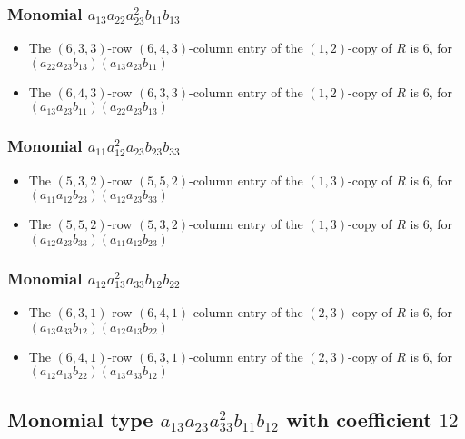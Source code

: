 \documentclass{article}
\begin{document}
\subsubsection{Monomial $ a_{13} a_{22} a_{23}^{2} b_{11} b_{13} $}

\begin{itemize}
\item The $(6, 3, 3)$-row $(6, 4, 3)$-column entry of the $ \left(1, 2\right) $-copy of $R$ is $ 6 $, for $( a_{22} a_{23} b_{13} )( a_{13} a_{23} b_{11} )$ 
\item The $(6, 4, 3)$-row $(6, 3, 3)$-column entry of the $ \left(1, 2\right) $-copy of $R$ is $ 6 $, for $( a_{13} a_{23} b_{11} )( a_{22} a_{23} b_{13} )$ 
\end{itemize}
\subsubsection{Monomial $ a_{11} a_{12}^{2} a_{23} b_{23} b_{33} $}

\begin{itemize}
\item The $(5, 3, 2)$-row $(5, 5, 2)$-column entry of the $ \left(1, 3\right) $-copy of $R$ is $ 6 $, for $( a_{11} a_{12} b_{23} )( a_{12} a_{23} b_{33} )$ 
\item The $(5, 5, 2)$-row $(5, 3, 2)$-column entry of the $ \left(1, 3\right) $-copy of $R$ is $ 6 $, for $( a_{12} a_{23} b_{33} )( a_{11} a_{12} b_{23} )$ 
\end{itemize}
\subsubsection{Monomial $ a_{12} a_{13}^{2} a_{33} b_{12} b_{22} $}

\begin{itemize}
\item The $(6, 3, 1)$-row $(6, 4, 1)$-column entry of the $ \left(2, 3\right) $-copy of $R$ is $ 6 $, for $( a_{13} a_{33} b_{12} )( a_{12} a_{13} b_{22} )$ 
\item The $(6, 4, 1)$-row $(6, 3, 1)$-column entry of the $ \left(2, 3\right) $-copy of $R$ is $ 6 $, for $( a_{12} a_{13} b_{22} )( a_{13} a_{33} b_{12} )$ 
\end{itemize}
\subsection{Monomial type $ a_{13} a_{23} a_{33}^{2} b_{11} b_{12} $ with coefficient $ 12 $}
\end{document}
